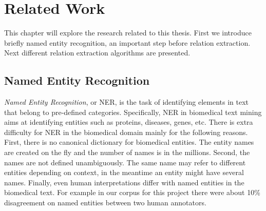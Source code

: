 \chapter{Related Work}  %

\ifpdf
    \graphicspath{{Background/Figs/Raster/}{Background/Figs/PDF/}{Background/Figs/}}
\else
    \graphicspath{{Background/Figs/Vector/}{Background/Figs/}}
\fi
This chapter will explore the research related to this thesis. First we introduce briefly named entity recognition, an important step before relation extraction. Next different relation extraction algorithms are presented.
\section{Named Entity Recognition} %
\emph{Named Entity Recognition}, or NER, is the task of identifying elements in text that belong to pre-defined categories. Specifically, NER in biomedical text mining aims at identifying entities such as proteins, diseases, genes, etc. There is extra difficulty for NER in the biomedical domain mainly for the following reasons. First, there is no canonical dictionary for biomedical entities\cite{cohen2005survey}. The entity names are created on the fly and the number of names is in the millions. Second, the names are not defined unambiguously\cite{wilbur2007biocreative}. The same name may refer to different entities depending on context, in the meantime an entity might have several names. Finally, even human interpretations differ with named entities in the biomedical text. For example in our corpus for this project there were about 10\% disagreement on named entities between two human annotators\cite{verspoor2013annotating}.
